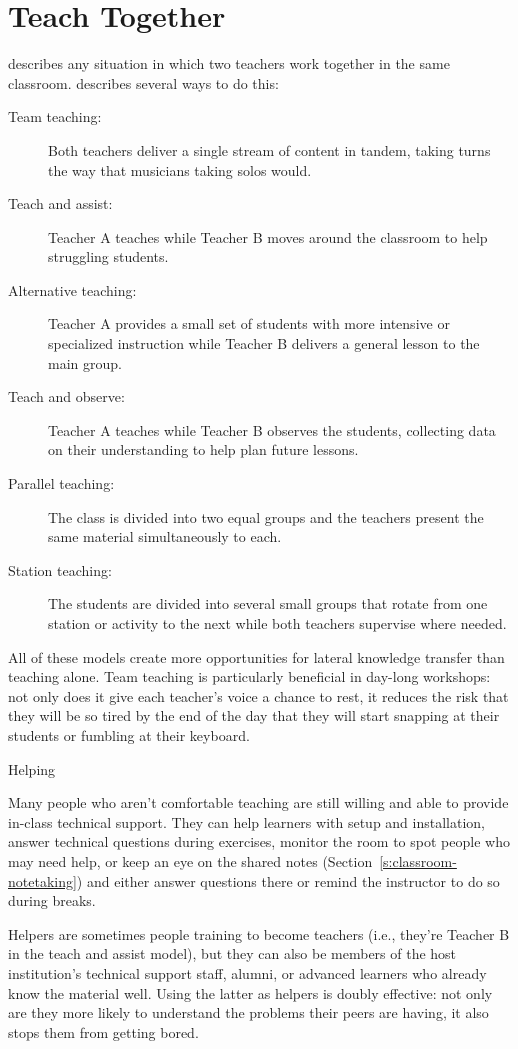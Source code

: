 \section{Teach Together}\label{s:classroom-together}

 describes any situation in
which two teachers work together in the same classroom.
\cite{Frie2016} describes several ways to do this:

\begin{description}
\item[Team teaching:]
Both teachers deliver a single stream of content in tandem, taking
turns the way that musicians taking solos would.
\item[Teach and assist:]
Teacher A teaches while Teacher B moves around the classroom to help
struggling students.
\item[Alternative teaching:]
Teacher A provides a small set of students with more intensive or
specialized instruction while Teacher B delivers a general lesson to
the main group.
\item[Teach and observe:]
Teacher A teaches while Teacher B observes the students, collecting
data on their understanding to help plan future lessons.
\item[Parallel teaching:]
The class is divided into two equal groups and the teachers present
the same material simultaneously to each.
\item[Station teaching:]
The students are divided into several small groups that rotate from
one station or activity to the next while both teachers supervise
where needed.
\end{description}

All of these models create more opportunities for lateral knowledge
transfer than teaching alone. Team teaching is particularly beneficial
in day-long workshops: not only does it give each teacher's voice a
chance to rest, it reduces the risk that they will be so tired by the
end of the day that they will start snapping at their students or
fumbling at their keyboard.

\begin{aside}{Helping}

Many people who aren't comfortable teaching are still willing and able
to provide in-class technical support. They can help learners with
setup and installation, answer technical questions during exercises,
monitor the room to spot people who may need help, or keep an eye on
the shared notes (Section~\ref{s:classroom-notetaking}) and either
answer questions there or remind the instructor to do so during
breaks.

Helpers are sometimes people training to become teachers (i.e.,
they're Teacher B in the teach and assist model), but they can also
be members of the host institution's technical support staff, alumni,
or advanced learners who already know the material well. Using the
latter as helpers is doubly effective: not only are they more likely
to understand the problems their peers are having, it also stops them
from getting bored.

\end{aside}

